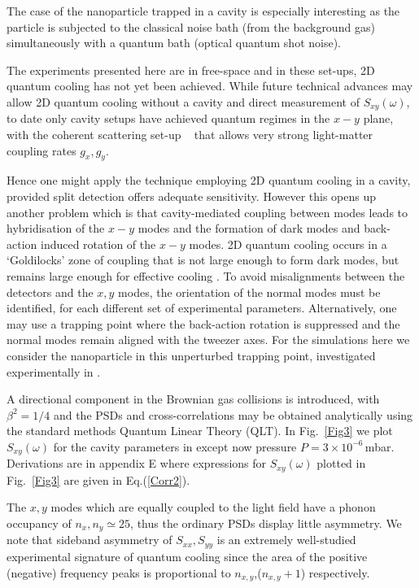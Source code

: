 \documentclass[twocolumn,english,notitlepage,superscriptaddress,nofootinbib]{revtex4-2}
\begin{document}
The case of the nanoparticle trapped in a cavity is especially interesting as the particle is subjected to the classical noise bath (from the background gas) simultaneously with  a quantum bath (optical quantum shot noise).

The  experiments presented here are in free-space and in these set-ups,   2D quantum cooling has not yet been achieved.  While future technical advances may allow 2D quantum cooling  without  a cavity and  direct measurement of $S_{xy}(\omega)$,  to date only cavity setups have achieved quantum regimes in the $x-y$ plane,  with the coherent scattering set-up ~\cite{delic2020cooling} that allows very strong light-matter coupling rates $g_x,g_y$.  

Hence one might apply the technique employing 2D quantum cooling in a cavity,  provided split detection offers adequate sensitivity.  However 
this opens up another problem which is that cavity-mediated coupling between modes leads to  hybridisation of the $x-y$ modes and the formation of dark modes \cite{MTTM2020, MTTM2021,Marin2021} and back-action induced rotation of the $x-y$ modes.   2D quantum cooling occurs in a `Goldilocks' zone of  coupling that is not  large enough to form dark modes,  but remains large enough for effective cooling \cite{MTTM2021,Novotny2023}.  To avoid misalignments between the detectors and the $x,y$ modes,  the orientation of the normal modes must be identified, for each different set of experimental parameters. Alternatively,  one may  use a trapping point where the back-action rotation is suppressed \cite{Pontin2023} and the normal modes remain aligned with the tweezer axes.  For the simulations here we consider the nanoparticle in this unperturbed trapping point, investigated experimentally in \cite{Pontin2023}.

A directional component in the Brownian gas collisions is introduced, with $\beta^2=1/4$ and the PSDs and cross-correlations may be obtained analytically using the standard methods Quantum Linear Theory (QLT).   
In Fig.~\ref{Fig3} we plot $S_{xy}(\omega)$  for the cavity parameters in \cite{Pontin2023}  except now pressure $P=3 \times 10^{-6}$\,mbar.
Derivations are in  appendix E where expressions for $S_{xy}(\omega)$ 
plotted in Fig.~\ref{Fig3} are given in Eq.(\ref{Corr2}).  

The $x,y$ modes which are equally coupled to the light field have a phonon occupancy of $n_x, n_y \simeq 25$, thus the ordinary PSDs display little asymmetry.  We note that sideband asymmetry of $S_{xx},S_{yy}$ is an extremely well-studied experimental signature of quantum  cooling since the area of the positive (negative) frequency peaks is proportional to $n_{x,y}$,($n_{x,y}+1$) respectively.  
\end{document}
